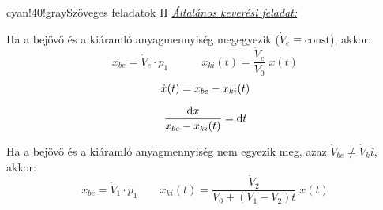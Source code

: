 \documentclass[main.tex]{subfiles}
\begin{document}
\begin{cbox}{cyan!40!gray}{Szöveges feladatok II}
  \emph{\underline{Általános keverési feladat:}}

  \begin{minipage}[c]{.5\textwidth}
    \begin{figure}[H]
      \centering
    \end{figure}
  \end{minipage}\hfill
  \begin{minipage}[c]{.5\textwidth}
    Ha a bejövő és a kiáramló anyagmennyiség megegyezik
    ($\dot{V}_{e} \equiv \mathrm{const}$), akkor:
    \[
      x_{be} = \dot{V}_{e} \cdot p_1
      \quad \quad \quad
      x_{ki}(t) = \frac{\dot{V}_e}{V_0} \; x(t)
    \]
    \begin{gather*}
      \dot{x}(t) = x_{be} - x_{ki}(t)
      \\[2mm]
      \frac{\mathrm{d} x}{x_{be} - x_{ki}(t)} = \mathrm{d} t
    \end{gather*}

    Ha a bejövő és a kiáramló anyagmennyiség nem egyezik meg,
    azaz $\dot{V}_{be} \neq \dot{V}_ki$, akkor:
    \[
      x_{be} = \dot{V}_{1} \cdot p_1
      \quad \quad
      x_{ki}(t) = \frac{\dot{V}_2}{V_0 + (V_1 - V_2)t} \; x(t)
    \]
  \end{minipage}
\end{cbox}
\end{document}
